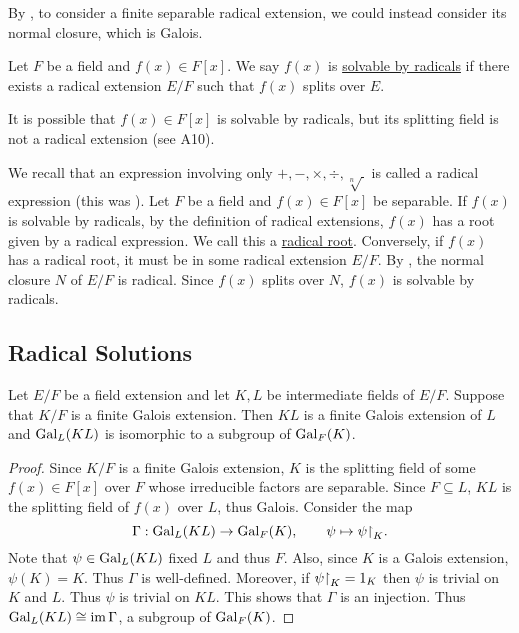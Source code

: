 \documentclass[11pt]{article}
\begin{document}
\begin{remark}
    By , to consider a finite separable radical extension, we could instead consider its normal closure, which is Galois.
\end{remark}

\begin{definition}
    Let $F$ be a field and $f(x)\in F[x]$. We say $f(x)$ is \ul{solvable by radicals} if there exists a radical extension $E/F$ such that $f(x)$ splits over $E$.
\end{definition}

\begin{remark}
    It is possible that $f(x)\in F[x]$ is solvable by radicals, but its splitting field is not a radical extension (see A10).
\end{remark}

\begin{remark}
    We recall that an expression involving only $+,-,\times,\div,\sqrt[n]{\,}$ is called a radical expression (this was ). Let $F$ be a field and $f(x)\in F[x]$ be separable. If $f(x)$ is solvable by radicals, by the definition of radical extensions, $f(x)$ has a root given by a radical expression. We call this a \ul{radical root}. Conversely, if $f(x)$ has a radical root, it must be in some radical extension $E/F$. By , the normal closure $N$ of $E/F$ is radical. Since $f(x)$ splits over $N$, $f(x)$ is solvable by radicals.
\end{remark}

\subsection{Radical Solutions}

\begin{lemma}
    Let $E/F$ be a field extension and let $K,L$ be intermediate fields of $E/F$. Suppose that $K/F$ is a finite Galois extension. Then $KL$ is a finite Galois extension of $L$ and $\operatorname{Gal}_L(KL)$ is isomorphic to a subgroup of $\operatorname{Gal}_F(K)$.
\end{lemma}

\begin{proof}
    Since $K/F$ is a finite Galois extension, $K$ is the splitting field of some $f(x)\in F[x]$ over $F$ whose irreducible factors are separable. Since $F\subseteq L$, $KL$ is the splitting field of $f(x)$ over $L$, thus Galois. Consider the map
    \[\Gamma:\operatorname{Gal}_L(KL)\to\operatorname{Gal}_F(K),\qquad\psi\mapsto\psi{\upharpoonright}_K.\]
    Note that $\psi\in\operatorname{Gal}_L(KL)$ fixed $L$ and thus $F$. Also, since $K$ is a Galois extension, $\psi(K)=K$. Thus $\Gamma$ is well-defined. Moreover, if $\psi{\upharpoonright}_K=1_K$ then $\psi$ is trivial on $K$ and $L$. Thus $\psi$ is trivial on $KL$. This shows that $\Gamma$ is an injection. Thus $\operatorname{Gal}_L(KL)\cong\operatorname{im}\Gamma$, a subgroup of $\operatorname{Gal}_F(K)$.
    
\end{proof}
\end{document}
